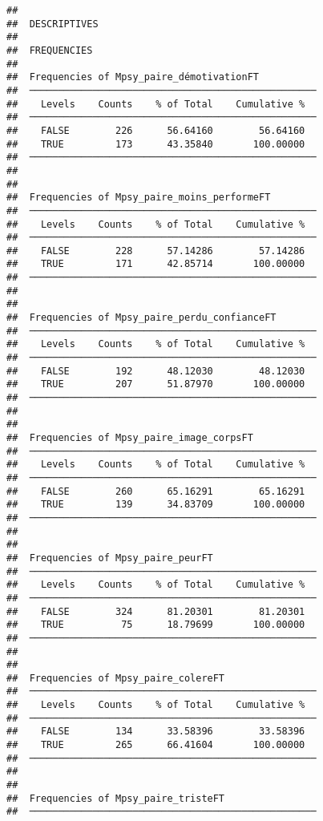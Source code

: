 \documentclass[
]{article}
\begin{document}
\begin{verbatim}
## 
##  DESCRIPTIVES
## 
##  FREQUENCIES
## 
##  Frequencies of Mpsy_paire_démotivationFT           
##  ────────────────────────────────────────────────── 
##    Levels    Counts    % of Total    Cumulative %   
##  ────────────────────────────────────────────────── 
##    FALSE        226      56.64160        56.64160   
##    TRUE         173      43.35840       100.00000   
##  ────────────────────────────────────────────────── 
## 
## 
##  Frequencies of Mpsy_paire_moins_performeFT         
##  ────────────────────────────────────────────────── 
##    Levels    Counts    % of Total    Cumulative %   
##  ────────────────────────────────────────────────── 
##    FALSE        228      57.14286        57.14286   
##    TRUE         171      42.85714       100.00000   
##  ────────────────────────────────────────────────── 
## 
## 
##  Frequencies of Mpsy_paire_perdu_confianceFT        
##  ────────────────────────────────────────────────── 
##    Levels    Counts    % of Total    Cumulative %   
##  ────────────────────────────────────────────────── 
##    FALSE        192      48.12030        48.12030   
##    TRUE         207      51.87970       100.00000   
##  ────────────────────────────────────────────────── 
## 
## 
##  Frequencies of Mpsy_paire_image_corpsFT            
##  ────────────────────────────────────────────────── 
##    Levels    Counts    % of Total    Cumulative %   
##  ────────────────────────────────────────────────── 
##    FALSE        260      65.16291        65.16291   
##    TRUE         139      34.83709       100.00000   
##  ────────────────────────────────────────────────── 
## 
## 
##  Frequencies of Mpsy_paire_peurFT                   
##  ────────────────────────────────────────────────── 
##    Levels    Counts    % of Total    Cumulative %   
##  ────────────────────────────────────────────────── 
##    FALSE        324      81.20301        81.20301   
##    TRUE          75      18.79699       100.00000   
##  ────────────────────────────────────────────────── 
## 
## 
##  Frequencies of Mpsy_paire_colereFT                 
##  ────────────────────────────────────────────────── 
##    Levels    Counts    % of Total    Cumulative %   
##  ────────────────────────────────────────────────── 
##    FALSE        134      33.58396        33.58396   
##    TRUE         265      66.41604       100.00000   
##  ────────────────────────────────────────────────── 
## 
## 
##  Frequencies of Mpsy_paire_tristeFT                 
##  ────────────────────────────────────────────────── 

\end{verbatim}
\end{document}
